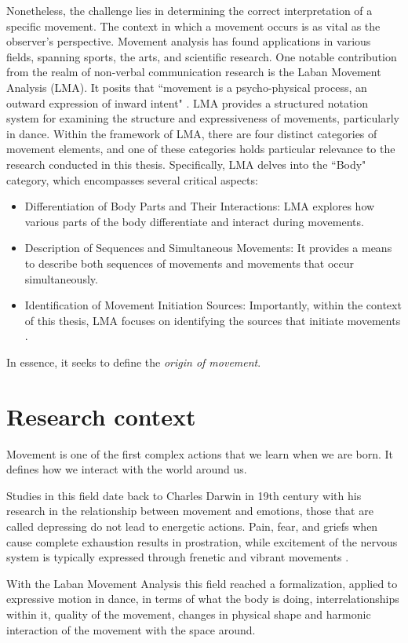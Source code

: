 Nonetheless, the challenge lies in determining the correct interpretation of a specific movement. 
The context in which a movement occurs is as vital as the observer's perspective. 
Movement analysis has found applications in various fields, spanning sports, the arts, and scientific research. 
One notable contribution from the realm of non-verbal communication research is the Laban Movement Analysis (LMA). 
It posits that “movement is a psycho-physical process, an outward expression of inward intent" \cite{Groff1995LabanMA}. 
LMA provides a structured notation system for examining the structure and expressiveness of movements, particularly in dance.
Within the framework of LMA, there are four distinct categories of movement elements, and one of these categories holds particular relevance to the research conducted in this thesis. 
Specifically, LMA delves into the “Body" category, which encompasses several critical aspects:
\begin{itemize}
    \item Differentiation of Body Parts and Their Interactions: LMA explores how various parts of the body differentiate and interact during movements.
    \item Description of Sequences and Simultaneous Movements: It provides a means to describe both sequences of movements and movements that occur simultaneously.  
    \item Identification of Movement Initiation Sources: Importantly, within the context of this thesis, LMA focuses on identifying the sources that initiate movements \cite{zhao2001synthesis}.
\end{itemize}
In essence, it seeks to define the \textit{origin of movement}.
    
\section{Research context}
Movement is one of the first complex actions that we learn when we are born. 
It defines how we interact with the world around us. 

Studies in this field date back to Charles Darwin in 19th century with his research in the relationship 
between movement and emotions, those that are called depressing do not lead to energetic actions. 
Pain, fear, and griefs when cause complete exhaustion results in prostration, 
while excitement of the nervous system is typically expressed through frenetic and vibrant movements \cite{darwin}.  

With the Laban Movement Analysis this field reached a formalization, applied to expressive motion in dance, 
in terms of what the body is doing, interrelationships within it, quality of the movement, 
changes in physical shape and harmonic interaction of the movement with the space around. 


